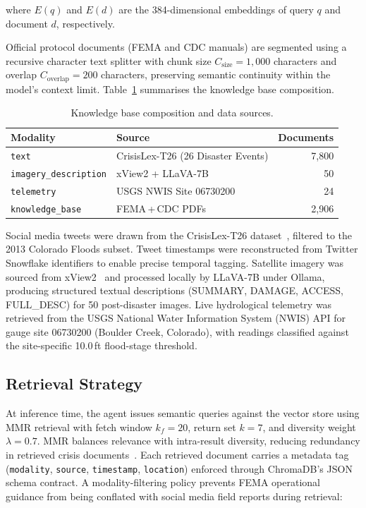 \documentclass[conference]{IEEEtran}
\begin{document}
\noindent where $E(q)$ and $E(d)$ are the 384-dimensional embeddings of
query $q$ and document $d$, respectively.

Official protocol documents (FEMA and CDC manuals) are segmented using a
recursive character text splitter with chunk size $C_{\text{size}}{=}1{,}000$
characters and overlap $C_{\text{overlap}}{=}200$ characters, preserving
semantic continuity within the model's context limit.
Table~\ref{tab:kb} summarises the knowledge base composition.

\begin{table}[ht]
\centering
\caption{Knowledge base composition and data sources.}
\label{tab:kb}
\renewcommand{\arraystretch}{1.2}
\begin{tabular}{@{}llr@{}}
\toprule
\textbf{Modality} & \textbf{Source} & \textbf{Documents} \\ \midrule
\texttt{text}                 & CrisisLex-T26 (26 Disaster Events) & 7{,}800 \\
\texttt{imagery\_description} & xView2 + LLaVA-7B              & 50 \\
\texttt{telemetry}            & USGS NWIS Site 06730200        & 24 \\
\texttt{knowledge\_base}      & FEMA\,+\,CDC PDFs              & 2{,}906 \\ \bottomrule
\end{tabular}
\end{table}

Social media tweets were drawn from the CrisisLex-T26 dataset~\cite{b21},
filtered to the 2013 Colorado Floods subset. Tweet timestamps were reconstructed
from Twitter Snowflake identifiers to enable precise temporal tagging.
Satellite imagery was sourced from xView2~\cite{b22} and processed locally by
LLaVA-7B under Ollama, producing structured textual descriptions (SUMMARY,
DAMAGE, ACCESS, FULL\_DESC) for 50 post-disaster images. Live hydrological
telemetry was retrieved from the USGS National Water Information System (NWIS)
API for gauge site 06730200 (Boulder Creek, Colorado), with readings classified
against the site-specific 10.0\,ft flood-stage threshold.

\subsection{Retrieval Strategy}

At inference time, the agent issues semantic queries against the vector store
using MMR retrieval with fetch window $k_f{=}20$, return set $k{=}7$, and
diversity weight $\lambda{=}0.7$. MMR balances relevance with intra-result
diversity, reducing redundancy in retrieved crisis documents~\cite{b25}. Each
retrieved document carries a metadata tag (\texttt{modality}, \texttt{source},
\texttt{timestamp}, \texttt{location}) enforced through ChromaDB's JSON schema
contract. A modality-filtering policy prevents FEMA operational guidance from
being conflated with social media field reports during retrieval:
\end{document}
